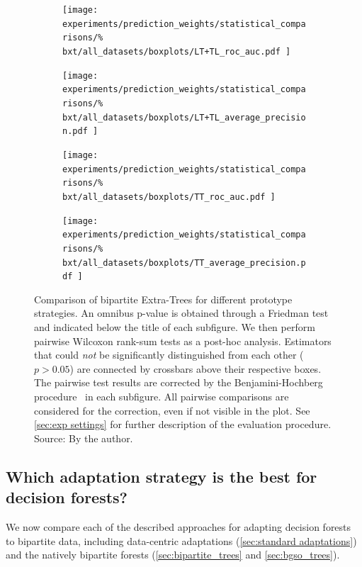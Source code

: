 \begin{figure}[tbh]
    \centering
    \begin{subfigure}{0.49\textwidth}
        \texttt{[image: 
            experiments/prediction\_weights/statistical\_comparisons/\%
            bxt/all\_datasets/boxplots/LT+TL\_roc\_auc.pdf
        ]}
    \end{subfigure}
    \begin{subfigure}{0.49\textwidth}
        \texttt{[image: 
            experiments/prediction\_weights/statistical\_comparisons/\%
            bxt/all\_datasets/boxplots/LT+TL\_average\_precision.pdf
        ]}
    \end{subfigure}

    \begin{subfigure}{0.49\textwidth}
        \texttt{[image: 
            experiments/prediction\_weights/statistical\_comparisons/\%
            bxt/all\_datasets/boxplots/TT\_roc\_auc.pdf
        ]}
    \end{subfigure}
    \begin{subfigure}{0.49\textwidth}
        \texttt{[image: 
            experiments/prediction\_weights/statistical\_comparisons/\%
            bxt/all\_datasets/boxplots/TT\_average\_precision.pdf
        ]}
    \end{subfigure}
    \caption{
        Comparison of bipartite Extra-Trees for different prototype strategies.
        An omnibus p-value is obtained through a Friedman test and indicated below the title of each subfigure.
        We then perform pairwise Wilcoxon rank-sum tests as a post-hoc analysis.
        Estimators that could \emph{not} be significantly distinguished from each other ($p > 0.05$) are connected by crossbars above their respective boxes. 
        The pairwise test results are corrected by the Benjamini-Hochberg procedure~\cite{benjamini1995controlling,haynes2013benjamini} in each subfigure. All pairwise comparisons are considered for the correction, even if not visible in the plot.
        See \autoref{sec:exp settings} for further description of the evaluation procedure. \newline Source: By the author.
    }
    \label{fig:pred_weights_bxt}
\end{figure}



\subsection{Which adaptation strategy is the best for decision forests?}
\label{sec:adaptation_comparison}
We now compare each of the described approaches for adapting decision forests to bipartite data, including data-centric adaptations (\autoref{sec:standard adaptations}) and the natively bipartite forests (\autoref{sec:bipartite_trees} and \autoref{sec:bgso_trees}).


